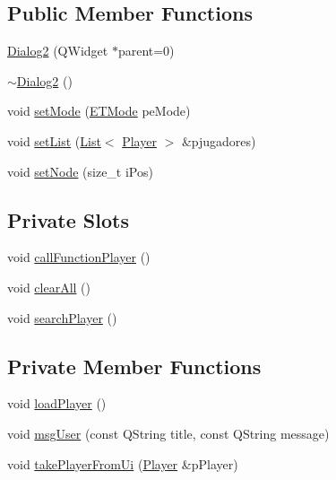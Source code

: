 \subsection*{Public Member Functions}
\begin{DoxyCompactItemize}
\item 
\hyperlink{class_dialog2_a78ae31daad000669cd54a31271ce9470}{Dialog2} (Q\+Widget $\ast$parent=0)
\item 
\hyperlink{class_dialog2_ae4ceaef72d01b76dcd126b54c875dfaa}{$\sim$\+Dialog2} ()
\item 
void \hyperlink{class_dialog2_ad11aeeec4bdf19f00fced524be1b4205}{set\+Mode} (\hyperlink{class_dialog2_a8516d2f5d38e3777d9c6a99c3374159a}{E\+T\+Mode} pe\+Mode)
\item 
void \hyperlink{class_dialog2_a15d71b221052d782bfdf156fe4aa7d75}{set\+List} (\hyperlink{class_list}{List}$<$ \hyperlink{class_player}{Player} $>$ \&pjugadores)
\item 
void \hyperlink{class_dialog2_afcb469b5706793d4048d621a0e4c3abd}{set\+Node} (size\+\_\+t i\+Pos)
\end{DoxyCompactItemize}
\subsection*{Private Slots}
\begin{DoxyCompactItemize}
\item 
void \hyperlink{class_dialog2_afb96c399f9c34cd43e4900cfa27bc239}{call\+Function\+Player} ()
\item 
void \hyperlink{class_dialog2_a529a4ad9cc78e83660171588b72cfe9e}{clear\+All} ()
\item 
void \hyperlink{class_dialog2_a4de4b4481a18d1001ac600a4fdcd4256}{search\+Player} ()
\end{DoxyCompactItemize}
\subsection*{Private Member Functions}
\begin{DoxyCompactItemize}
\item 
void \hyperlink{class_dialog2_a0de735354c5eab3294223f035bb14cad}{load\+Player} ()
\item 
void \hyperlink{class_dialog2_af42c743a70fb796d4fafd0e55cff004a}{msg\+User} (const Q\+String title, const Q\+String message)
\item 
void \hyperlink{class_dialog2_a7d1f42eb6a8798be34da38e4df4929f7}{take\+Player\+From\+Ui} (\hyperlink{class_player}{Player} \&p\+Player)
\end{DoxyCompactItemize}
